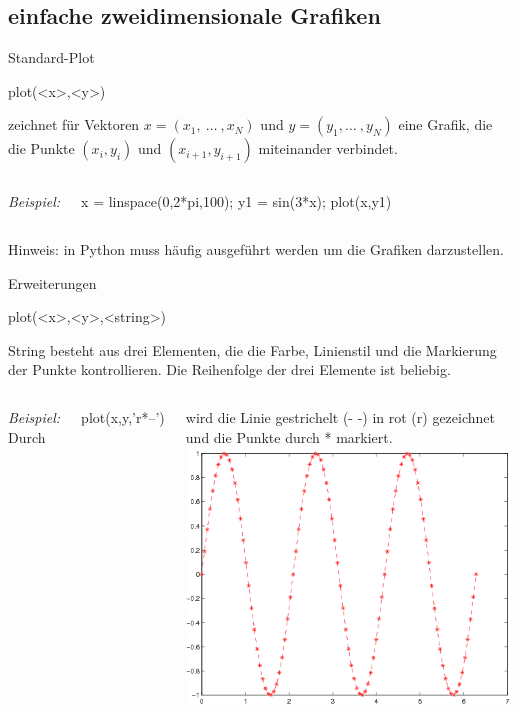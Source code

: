 \documentclass[hyperref={xetex}]{beamer}
\begin{document}
\subsection{einfache zweidimensionale Grafiken}
% 
% 
\begin{frame}[fragile]{Standard-Plot}
\begin{matlabin}
plot(<x>,<y>)
\end{matlabin}
zeichnet für Vektoren $x=(x_1, \ \dots \ ,x_N)$ und  $y=(y_1, \dots \ ,y_N)$
eine Grafik, die die Punkte $(x_i,y_i)$ und $(x_{i+1},y_{i+1})$ miteinander
verbindet.

\begin{columns}[c]
\textit{Beispiel:}
\begin{matlabin}
x = linspace(0,2*pi,100);
y1 = sin(3*x);
plot(x,y1)
\end{matlabin}
\end{columns}
\alert{Hinweis:} in Python muss häufig  ausgeführt werden um die Grafiken darzustellen.
\end{frame}
% 
% 
\begin{frame}[fragile]{Erweiterungen}
\begin{matlabin}
plot(<x>,<y>,<string>)
\end{matlabin}
\alert{String} besteht aus drei Elementen, die die Farbe, Linienstil
und die Markierung der Punkte kontrollieren. Die Reihenfolge der drei
Elemente ist beliebig.
\begin{columns}[c]
\textit{Beispiel:} Durch \\
\begin{matlabin}
plot(x,y,'r*--') 
\end{matlabin}
wird die Linie
gestrichelt (- -) in rot (r) gezeichnet und die Punkte durch *
markiert.
\includegraphics[width=\textwidth]{figures/grafik_2}
\end{columns}
\end{frame}
\end{document}
